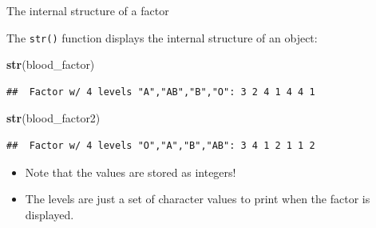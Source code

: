 \documentclass[ignorenonframetext,]{beamer}
\newenvironment{Shaded}{\begin{snugshade}}{\end{snugshade}}
\newcommand{\KeywordTok}[1]{\textcolor[rgb]{0.13,0.29,0.53}{\textbf{#1}}}
\newcommand{\NormalTok}[1]{#1}
\begin{document}
\begin{frame}[fragile]{The internal structure of a factor}
\protect\hypertarget{the-internal-structure-of-a-factor}{}

The \texttt{str()} function displays the internal structure of an
object:

\begin{Shaded}
\begin{Highlighting}[]
\KeywordTok{str}\NormalTok{(blood_factor)}
\end{Highlighting}
\end{Shaded}

\begin{verbatim}
##  Factor w/ 4 levels "A","AB","B","O": 3 2 4 1 4 4 1
\end{verbatim}

\begin{Shaded}
\begin{Highlighting}[]
\KeywordTok{str}\NormalTok{(blood_factor2)}
\end{Highlighting}
\end{Shaded}

\begin{verbatim}
##  Factor w/ 4 levels "O","A","B","AB": 3 4 1 2 1 1 2
\end{verbatim}

\begin{itemize}
\item
  Note that the values are stored as integers!
\item
  The levels are just a set of character values to print when the factor
  is displayed.
\end{itemize}

\end{frame}
\end{document}
